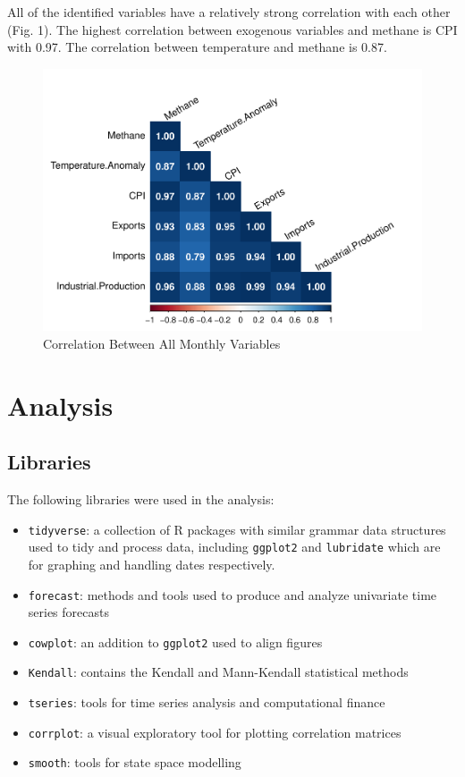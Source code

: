 \documentclass[
]{article}
\providecommand{\tightlist}{%
  \setlength{\itemsep}{0pt}\setlength{\parskip}{0pt}}
\begin{document}
All of the identified variables have a relatively strong correlation
with each other (Fig. 1). The highest correlation between exogenous
variables and methane is CPI with 0.97. The correlation between
temperature and methane is 0.87.

\begin{figure}
\centering
\includegraphics{Final_Report_files/figure-latex/unnamed-chunk-4-1.pdf}
\caption{Correlation Between All Monthly Variables}
\end{figure}

\section{Analysis}\label{analysis}

\subsection{Libraries}\label{libraries}

The following libraries were used in the analysis:

\begin{itemize}
\tightlist
\item
  \texttt{tidyverse}: a collection of R packages with similar grammar
  data structures used to tidy and process data, including
  \texttt{ggplot2} and \texttt{lubridate} which are for graphing and
  handling dates respectively.
\item
  \texttt{forecast}: methods and tools used to produce and analyze
  univariate time series forecasts
\item
  \texttt{cowplot}: an addition to \texttt{ggplot2} used to align
  figures
\item
  \texttt{Kendall}: contains the Kendall and Mann-Kendall statistical
  methods
\item
  \texttt{tseries}: tools for time series analysis and computational
  finance
\item
  \texttt{corrplot}: a visual exploratory tool for plotting correlation
  matrices
\item
  \texttt{smooth}: tools for state space modelling
\end{itemize}
\end{document}
